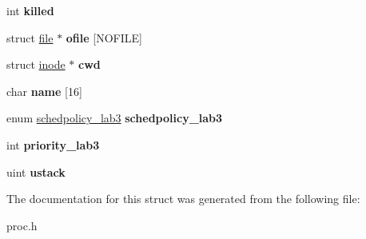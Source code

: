 \begin{DoxyCompactItemize}
\item 
int {\bfseries killed}\hypertarget{structproc_afb4f94a3f4df9a835dbb41b0c26660a4}{}\label{structproc_afb4f94a3f4df9a835dbb41b0c26660a4}

\item 
struct \hyperlink{structfile}{file} $\ast$ {\bfseries ofile} \mbox{[}N\+O\+F\+I\+LE\mbox{]}\hypertarget{structproc_a4a9eb0352efe3fc097c91fccfaac50bd}{}\label{structproc_a4a9eb0352efe3fc097c91fccfaac50bd}

\item 
struct \hyperlink{structinode}{inode} $\ast$ {\bfseries cwd}\hypertarget{structproc_a493bc338ce008a838eef521972a35257}{}\label{structproc_a493bc338ce008a838eef521972a35257}

\item 
char {\bfseries name} \mbox{[}16\mbox{]}\hypertarget{structproc_ac04af53e17d24b90c3cbfab56d658d62}{}\label{structproc_ac04af53e17d24b90c3cbfab56d658d62}

\item 
enum \hyperlink{sched_8h_a535556cdcf29b612499f57b24c963364}{schedpolicy\+\_\+lab3} {\bfseries schedpolicy\+\_\+lab3}\hypertarget{structproc_a0ffe0394d8404f50596733058d8069b8}{}\label{structproc_a0ffe0394d8404f50596733058d8069b8}

\item 
int {\bfseries priority\+\_\+lab3}\hypertarget{structproc_aa323a7bacc088f7042a7b015080fc8f6}{}\label{structproc_aa323a7bacc088f7042a7b015080fc8f6}

\item 
uint {\bfseries ustack}\hypertarget{structproc_a4722b3b20db1b92dab48e1fb55161616}{}\label{structproc_a4722b3b20db1b92dab48e1fb55161616}

\end{DoxyCompactItemize}


The documentation for this struct was generated from the following file\+:\begin{DoxyCompactItemize}
\item 
proc.\+h\end{DoxyCompactItemize}
